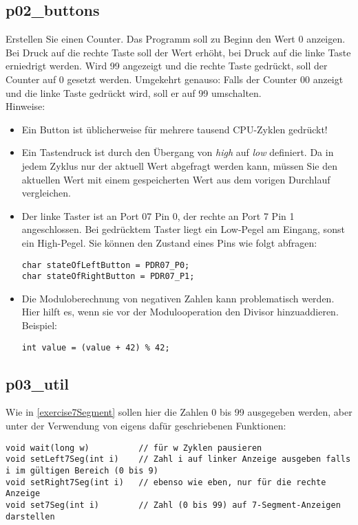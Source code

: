 \documentclass[
  accentcolor=tud1c,	%
  colorbacktitle,		%
  inverttitle,			%
  german,				%
  twoside
]{tudexercise}
\begin{document}
\subsection{p02\_buttons}
Erstellen Sie einen Counter. Das Programm soll zu Beginn den Wert 0 anzeigen. Bei Druck auf die rechte Taste soll der Wert erhöht, bei Druck auf die linke Taste erniedrigt werden. Wird 99 angezeigt und die rechte Taste gedrückt, soll der Counter auf 0 gesetzt werden. Umgekehrt genauso:
Falls der Counter 00 anzeigt und die linke Taste gedrückt wird, soll er auf 99 umschalten.\\
Hinweise:\begin{itemize}
\item
Ein Button ist üblicherweise für mehrere tausend CPU-Zyklen gedrückt!

\item
Ein Tastendruck ist durch den Übergang von \emph{high} auf \emph{low} definiert.
Da in jedem Zyklus nur der aktuell Wert abgefragt werden kann, müssen Sie den aktuellen Wert mit einem gespeicherten Wert aus dem vorigen Durchlauf vergleichen.

\item
Der linke Taster ist an Port 07 Pin 0, der rechte an Port 7 Pin 1 angeschlossen.
Bei gedrücktem Taster liegt ein Low-Pegel am Eingang, sonst ein High-Pegel.
Sie können den Zustand eines Pins wie folgt abfragen:
\begin{lstlisting}
char stateOfLeftButton = PDR07_P0; 
char stateOfRightButton = PDR07_P1;
\end{lstlisting}

\item
Die Moduloberechnung von negativen Zahlen kann problematisch werden.
Hier hilft es, wenn sie vor der Modulooperation den Divisor hinzuaddieren.
Beispiel:
\begin{lstlisting}
int value = (value + 42) % 42;
\end{lstlisting}

\end{itemize}

\subsection{p03\_util}
\label{exercise7SegmentUtil}
Wie in \ref{exercise7Segment} sollen hier die Zahlen 0 bis 99 ausgegeben werden, aber unter der Verwendung von eigens dafür geschriebenen Funktionen:
\begin{lstlisting}
void wait(long w)          // für w Zyklen pausieren
void setLeft7Seg(int i)    // Zahl i auf linker Anzeige ausgeben falls i im gültigen Bereich (0 bis 9)
void setRight7Seg(int i)   // ebenso wie eben, nur für die rechte Anzeige
void set7Seg(int i)        // Zahl (0 bis 99) auf 7-Segment-Anzeigen darstellen
\end{lstlisting}
\end{document}
